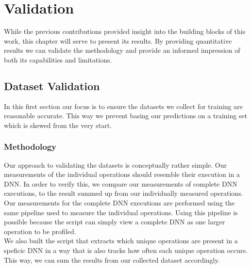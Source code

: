 \chapter{Validation}\label{chap:contrib3}

While the previous contributions provided insight into the building blocks of this work, this chapter will serve to present its results. By providing quantitative results we can validate the methodology and provide an informed impression of both its capabilities and limitations. 


\section{Dataset Validation}
In this first section our focus is to ensure the datasets we collect for training are reasonable accurate. This way we prevent basing our predictions on a training set which is skewed from the very start.

\subsection{Methodology}
Our approach to validating the datasets is conceptually rather simple. Our measurements of the individual operations should resemble their execution in a DNN. In order to verify this, we compare our measurements of complete DNN executions, to the result summed up from our individually measured operations. \\
Our measurements for the complete DNN executions are performed using the same pipeline used to measure the individual operations. Using this pipeline is possible because the script can simply view a complete DNN as one larger operation to be profiled.\\
We also built the script that extracts which unique operations are present in a speficic DNN in a way that is also tracks how often each unique operation occurs. This way, we can sum the results from our collected dataset accordingly.


